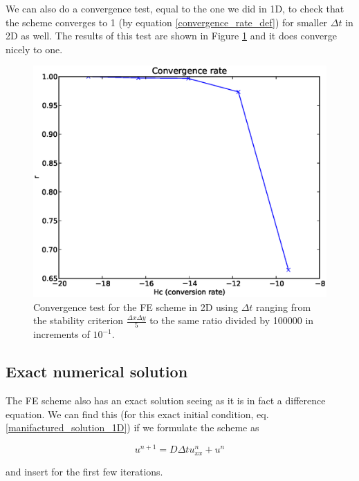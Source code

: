 We can also do a convergence test, equal to the one we did in 1D, to check that the scheme converges to 1 (by equation \eqref{convergence_rate_def}) for smaller $\Delta t$ in 2D as well. 
The results of this test are shown in Figure \ref{convergence_test_FE_2d} and it does converge nicely to one.

\begin{figure}[H]
\centering
\includegraphics[scale=0.7]{../doc/results/experiment_29112013_1709/results/ConvergenceTest.eps}
\caption[Convergence test FE 2D]{Convergence test for the FE scheme in 2D using $\Delta t$ ranging from the stability criterion $\frac{\Delta x\Delta y}{5}$ to the same ratio divided by 100000 in increments of $10^{-1}$.}
\label{convergence_test_FE_2d}
\end{figure}

\subsection{Exact numerical solution}\label{exact_numerical_solution}

The FE scheme also has an exact solution seeing as it is in fact a difference equation. 
We can find this (for this exact initial condition, eq. \ref{manifactured_solution_1D}) if we formulate the scheme as 

\begin{equation}
 u^{n+1} = D\Delta t u_{xx}^n + u^n
\end{equation}

and insert for the first few iterations. 


